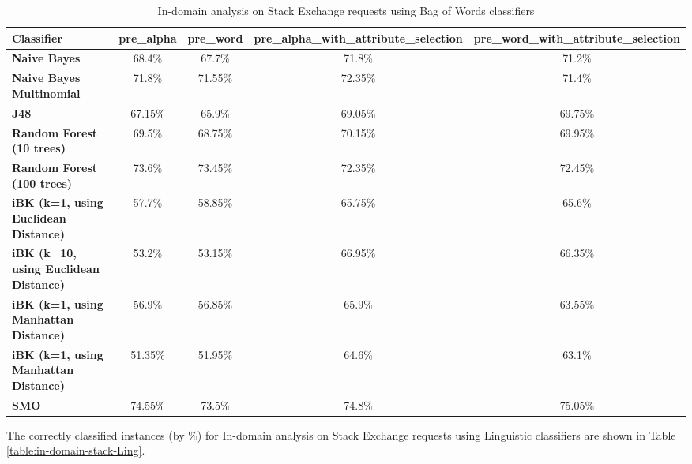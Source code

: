 \documentclass[conference]{IEEEtran}
\begin{document}
\begin{table*}[htbp]
\caption{In-domain analysis on Stack Exchange requests using Bag of Words classifiers }
\centering
\vspace{5pt}
\begin{tabular}{|l|c|c|c|c|}
\hline
\textbf{Classifier} & \textbf{pre\_alpha} & \textbf{pre\_word} & \textbf{pre\_alpha\_with\_attribute\_selection} & \textbf{pre\_word\_with\_attribute\_selection} \\
\hline\hline
\textbf{Naive Bayes} & 68.4\% & 67.7\% & 71.8\% & 71.2\% \\ 
\hline
\textbf{Naive Bayes Multinomial} & 71.8\% & 71.55\% & 72.35\% & 71.4\% \\ 
\hline
\textbf{J48} & 67.15\% & 65.9\% & 69.05\% & 69.75\% \\ 
\hline
\textbf{Random Forest (10 trees)} & 69.5\% & 68.75\% & 70.15\% & 69.95\% \\ 
\hline
\textbf{Random Forest (100 trees)} & 73.6\% & 73.45\% & 72.35\% & 72.45\% \\ 
\hline
\textbf{iBK (k=1, using Euclidean Distance)} & 57.7\% & 58.85\% & 65.75\% & 65.6\% \\ 
\hline
\textbf{iBK (k=10, using Euclidean Distance)} & 53.2\% & 53.15\% & 66.95\% & 66.35\% \\ 
\hline
\textbf{iBK (k=1, using Manhattan Distance)} & 56.9\% & 56.85\% & 65.9\% & 63.55\% \\ 
\hline
\textbf{iBK (k=1, using Manhattan Distance)} & 51.35\% & 51.95\% & 64.6\% & 63.1\% \\ 
\hline
\textbf{SMO} & 74.55\% & 73.5\% & 74.8\% & 75.05\% \\ 
\hline
\hline
\end{tabular}
\label{table:in-domain-stack-BOW}
\end{table*}

The correctly classified instances (by \%) for In-domain analysis on Stack Exchange requests using Linguistic classifiers are shown in Table \ref{table:in-domain-stack-Ling}.
\end{document}
